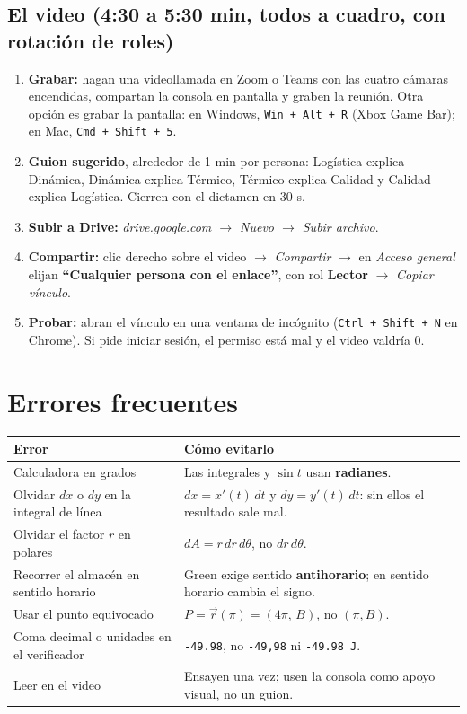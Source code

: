 \documentclass[11pt,letterpaper]{article}
\begin{document}
\subsection*{El video (4:30 a 5:30 min, todos a cuadro, con rotación de roles)}
\begin{enumerate}
\item \textbf{Grabar:} hagan una videollamada en Zoom o Teams con las cuatro cámaras encendidas, compartan la consola en pantalla y graben la reunión. Otra opción es grabar la pantalla: en Windows, \texttt{Win + Alt + R} (Xbox Game Bar); en Mac, \texttt{Cmd + Shift + 5}.
\item \textbf{Guion sugerido}, alrededor de 1 min por persona: Logística explica Dinámica, Dinámica explica Térmico, Térmico explica Calidad y Calidad explica Logística. Cierren con el dictamen en 30 s.
\item \textbf{Subir a Drive:} \emph{drive.google.com \(\rightarrow\) Nuevo \(\rightarrow\) Subir archivo}.
\item \textbf{Compartir:} clic derecho sobre el video \(\rightarrow\) \emph{Compartir} \(\rightarrow\) en \emph{Acceso general} elijan \textbf{``Cualquier persona con el enlace''}, con rol \textbf{Lector} \(\rightarrow\) \emph{Copiar vínculo}.
\item \textbf{Probar:} abran el vínculo en una ventana de incógnito (\texttt{Ctrl + Shift + N} en Chrome). Si pide iniciar sesión, el permiso está mal y el video valdría 0.
\end{enumerate}

\section{Errores frecuentes}
\begin{center}\small
\begin{tabularx}{\linewidth}{@{}>{\raggedright\arraybackslash}p{5.2cm} Y@{}}\toprule
\textbf{Error} & \textbf{Cómo evitarlo}\\\midrule
Calculadora en grados & Las integrales y \(\sin t\) usan \textbf{radianes}. \\
Olvidar \(dx\) o \(dy\) en la integral de línea & \(dx=x'(t)\,dt\) y \(dy=y'(t)\,dt\): sin ellos el resultado sale mal. \\
Olvidar el factor \(r\) en polares & \(dA=r\,dr\,d\theta\), no \(dr\,d\theta\). \\
Recorrer el almacén en sentido horario & Green exige sentido \textbf{antihorario}; en sentido horario cambia el signo. \\
Usar el punto equivocado & \(P=\vec r(\pi)=(4\pi,\,B)\), no \((\pi,B)\). \\
Coma decimal o unidades en el verificador & \texttt{-49.98}, no \texttt{-49,98} ni \texttt{-49.98 J}. \\
Leer en el video & Ensayen una vez; usen la consola como apoyo visual, no un guion. \\ \bottomrule
\end{tabularx}\end{center}
\end{document}
